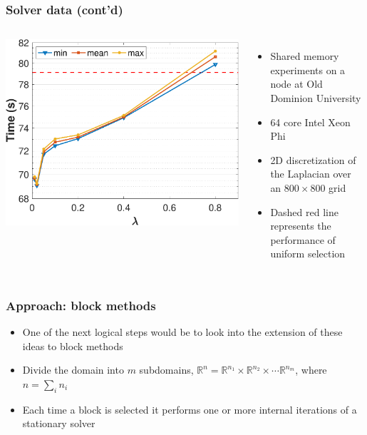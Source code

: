 \documentclass{beamer}
\begin{document}
\begin{frame}
	\frametitle{Solver data (cont'd)}
       \begin{columns}
             \centering
             \includegraphics[width=\linewidth]{images/expoDist_calcTimes_all_1tbr.pdf}
              \begin{itemize}
                  \item Shared memory experiments on a node at Old Dominion University
                  \item 64 core Intel Xeon Phi
                  \item 2D discretization of the Laplacian over an $800 \times 800$ grid
                  \item Dashed red line represents the performance of uniform selection
              \end{itemize}
         \end{columns}
\end{frame}




\begin{frame}
	\frametitle{Approach: block methods}
	\begin{itemize}
	    \item One of the next logical steps would be to look into the extension of these ideas to block methods
		\item Divide the domain into $m$ subdomains, $\mathbb{R}^n = \mathbb{R}^{n_1} \times \mathbb{R}^{n_2} \times \cdots \mathbb{R}^{n_m}$, where $n = \sum_i n_i$
		\item Each time a block is selected it performs one or more internal iterations of a stationary solver
	\end{itemize}
\end{frame}
\end{document}
